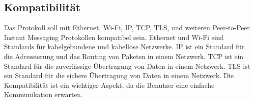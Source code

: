 \subsection{Kompatibilität}



Das Protokoll soll mit Ethernet, Wi-Fi, IP, TCP, TLS, und weiteren Peer-to-Peer Instant Messaging
Protokollen kompatibel sein. Ethernet und Wi-Fi sind Standards für kabelgebundene und kabellose
Netzwerke. IP ist ein Standard für die Adressierung und das Routing von Paketen in einem Netzwerk.
TCP ist ein Standard für die zuverlässige Übertragung von Daten in einem Netzwerk. TLS ist ein
Standard für die sichere Übertragung von Daten in einem Netzwerk. Die Kompatibilität ist ein
wichtiger Aspekt, da die Benutzer eine einfache Kommunikation erwarten.

